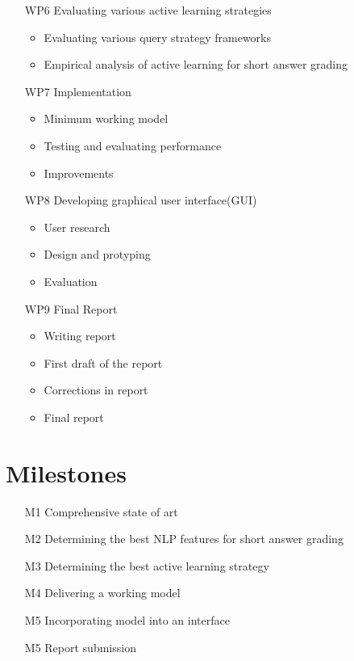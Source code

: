 \documentclass[rnd]{mas_proposal}
\begin{document}
\begin{enumerate}
\begin{itemize}
    \end{itemize}
	\item[WP6] Evaluating various active learning strategies
	\begin{itemize}
    \item Evaluating various query strategy frameworks
    \item Empirical analysis of active learning for short answer grading
    \end{itemize}
	\item[WP7] Implementation
	\begin{itemize}
    \item Minimum working model
    \item Testing and evaluating performance
    \item Improvements
    \end{itemize}
	\item[WP8] Developing graphical user interface(GUI)
	\begin{itemize}
    \item User research
    \item Design and protyping
    \item Evaluation
    \end{itemize}
	\item[WP9] Final Report
	\begin{itemize}
    \item Writing report
    \item First draft of the report
    \item Corrections in report
    \item Final report
    \end{itemize}
\end{enumerate}



\section{Milestones}
\begin{enumerate}
    \item[M1] Comprehensive state of art
    \item[M2] Determining the best NLP features for short answer grading
    \item[M3] Determining the best active learning strategy
    \item[M4] Delivering a working model
    \item[M5] Incorporating model into an interface
    \item[M5] Report submission
\end{enumerate}
\newpage
\end{document}
